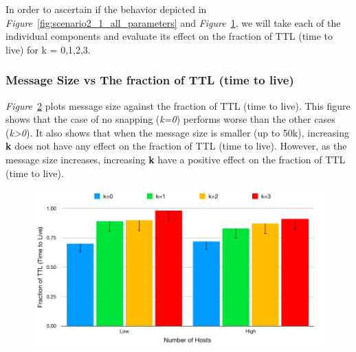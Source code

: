 {\begin{figure}[H]
  \label{fig:scenario2_1_2_all_parameters}
\end{figure}
In order to ascertain if the behavior depicted in \emph{Figure}~\ref{fig:scenario2_1_all_parameters} and \emph{Figure}~\ref{fig:scenario2_1_2_all_parameters}, we will take each of the individual components and evaluate its effect on the fraction of TTL (time to live) for k = 0,1,2,3.
\newpage
\subsubsection{Message Size vs The fraction of TTL (time to live)}
\emph{Figure}~\ref{fig:scenario2_2_message_size} plots message size against the fraction of TTL (time to live). This figure shows that the case of no snapping (\textit{k=0}) performs worse than the other cases (\textit{k>0}). It also shows that when the message size is smaller (up to 50k), increasing \textbf{k} does not have any effect on the fraction of TTL (time to live). However, as the message size increases, increasing \textbf{k} have a positive effect on the fraction of TTL (time to live).

\begin{figure}[H]
  \centering
  \includegraphics[scale=0.4]{./figures/scenario2_2_message_size}
  \label{fig:scenario2_2_message_size}
\end{figure}

}
